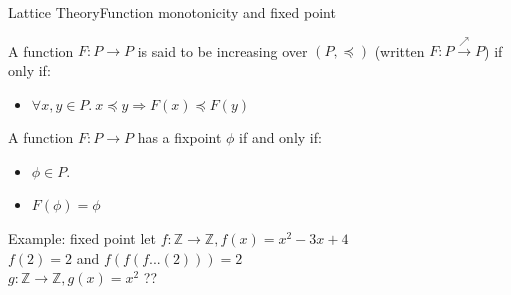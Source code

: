 \begin{frame}{Lattice Theory}{Function monotonicity and fixed point}
\begin{definition}
	A function $F: P \rightarrow P$ is said to be increasing over $(P,\preceq) $ (written  $F: P \xrightarrow{\scriptscriptstyle \nearrow} P$) if only if:
	\begin{itemize}
		\item $\forall x, y \in P.~x \preceq y \Rightarrow F(x) \preceq F(y)$
	\end{itemize}
\end{definition}

\begin{definition}
	A function $F: P\rightarrow P$ has a fixpoint $\phi$ if and only if: 
	\begin{itemize}
		\item $\phi \in P$.
		\item $F(\phi)=\phi$
	\end{itemize}
\end{definition}



\begin{exampleblock}{Example: fixed point}
let 	$f :\mathbb{Z}  \rightarrow \mathbb{Z} , f(x)= x^2 - 3x +4 $\\
$f(2)=2$ and $f(f(f...(2)))=2$\\

$g :\mathbb{Z}  \rightarrow \mathbb{Z} , g(x)= x^2$ ??
\end{exampleblock}
\end{frame}


